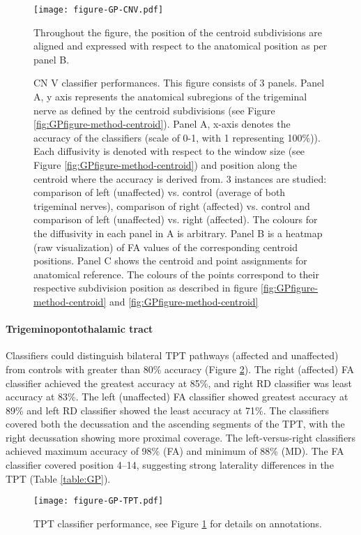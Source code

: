 \begin{figure}[ht]
\centering
\texttt{[image: figure-GP-CNV.pdf]}
\caption{CN V classifier performances. This figure consists of 3 panels. Panel A, y axis represents the anatomical subregions of the trigeminal nerve as defined by the centroid subdivisions (see Figure \ref{fig:GPfigure-method-centroid}). Panel A, x-axis denotes the accuracy of the classifiers (scale of 0-1, with 1 representing 100\%)). Each diffusivity is denoted with respect to the window size (see Figure \ref{fig:GPfigure-method-centroid}) and position along the centroid where the accuracy is derived from. 3 instances are studied: comparison of left (unaffected) vs. control (average of both trigeminal nerves), comparison of right (affected) vs. control and comparison of left (unaffected) vs. right (affected). The colours for the diffusivity in each panel in A is arbitrary. Panel B is a heatmap (raw visualization) of FA values of the corresponding centroid positions. Panel C shows the centroid and point assignments for anatomical reference. The colours of the points correspond to their respective subdivision position as described in figure \ref{fig:GPfigure-method-centroid} and \ref{fig:GPfigure-method-centroid}} Throughout the figure, the position of the centroid subdivisions are aligned and expressed with respect to the anatomical position as per panel B.
\label{fig:GPfigure4}
\end{figure}

\paragraph{Trigeminopontothalamic tract}
Classifiers could distinguish bilateral TPT pathways (affected and unaffected) from controls with greater than 80\% accuracy (Figure \ref{fig:GPfigureTPT}). The right (affected) FA classifier achieved the greatest accuracy at 85\%, and right RD classifier was least accuracy at 83\%. The left (unaffected) FA classifier showed greatest accuracy at 89\% and left RD classifier showed the least accuracy at 71\%. The classifiers covered both the decussation and the ascending segments of the TPT, with the right decussation showing more proximal coverage. The left-versus-right classifiers achieved maximum accuracy of 98\% (FA) and minimum of 88\% (MD). The FA classifier covered position 4--14, suggesting strong laterality differences in the TPT (Table \ref{table:GP}). 

\begin{figure}[ht]
\centering
\texttt{[image: figure-GP-TPT.pdf]}
\caption{TPT classifier performance, see Figure \ref{fig:GPfigure4} for details on annotations.}
\label{fig:GPfigureTPT}
\end{figure}

